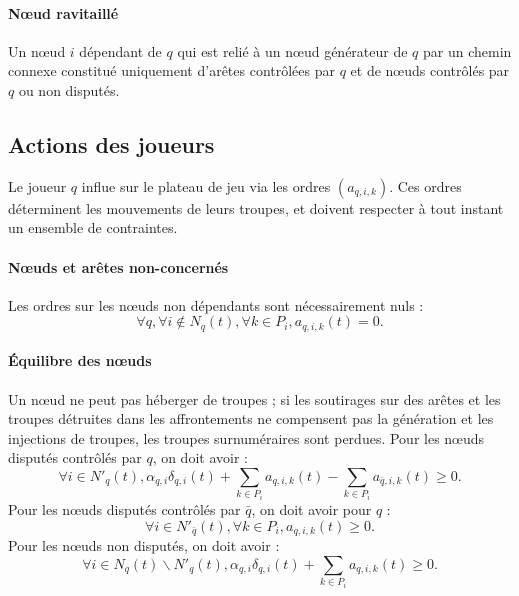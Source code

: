 \documentclass[a4paper,11pt,headings=normal]{scrartcl}
\theoremstyle{mythm}
\begin{document}
\paragraph{Nœud ravitaillé} Un nœud $i$ dépendant de $q$ qui est relié à un
nœud générateur de $q$ par un chemin connexe constitué uniquement
d'arêtes contrôlées par $q$ et de nœuds contrôlés par $q$ ou non disputés.

\subsection{Actions des joueurs}
\label{déroulé:actions}

Le joueur $q$ influe sur le plateau de jeu via les ordres
$(a_{q,i,k})$. Ces ordres déterminent les mouvements de leurs troupes,
et doivent respecter à tout instant un ensemble de contraintes.

\paragraph{Nœuds et arêtes non-concernés} Les ordres sur les nœuds non
dépendants sont nécessairement nuls :
\begin{equation}
  \forall q, \forall i \notin N_q(t), \forall k \in P_i, a_{q,i,k}(t) = 0.
\end{equation}

\paragraph{{\'E}quilibre des nœuds} Un nœud ne peut pas
héberger de troupes ; si les soutirages sur des arêtes et les troupes
détruites dans les affrontements ne compensent pas la génération et
les injections de troupes, les troupes surnuméraires sont
perdues. Pour les nœuds disputés contrôlés par $q$, on doit avoir :
\begin{equation}
  \label{eq:equilibre-noeud:disputé:possesseur}
  \forall i \in N'_q(t), \alpha_{q,i} \delta_{q,i}(t) + \sum_{k \in P_i} a_{q,i,k}(t) - \sum_{k \in P_i} a_{{\bar q},i,k}(t) \geq 0.
\end{equation}
Pour les nœuds disputés contrôlés par $\bar q$, on doit avoir pour $q$
:
\begin{equation}
  \forall i \in N'_{\bar q}(t), \forall k \in P_i, a_{q,i,k}(t) \geq 0.
\end{equation}
Pour les nœuds non disputés, on doit avoir :
\begin{equation}
  \forall i \in N_q(t) \backslash N'_q(t), \alpha_{q,i} \delta_{q,i}(t) + \sum_{k \in P_i} a_{q,i,k}(t) \geq 0.
\end{equation}
\end{document}
